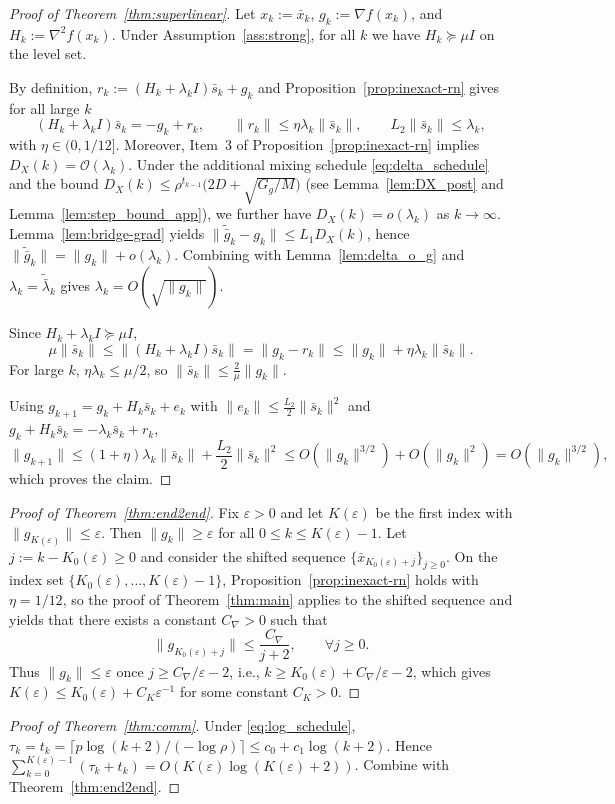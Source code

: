 \documentclass[11pt,a4paper]{article}
\def\cO{O}%
\newcommand{\cO}{\mathcal{O}}
\begin{document}
\begin{proof}[Proof of Theorem~\ref{thm:superlinear}]
Let $x_k:=\bar x_k$, $g_k:=\nabla f(x_k)$, and $H_k:=\nabla^2 f(x_k)$.
Under Assumption~\ref{ass:strong}, for all $k$ we have $H_k\succeq \mu I$ on the level set.

By definition, $r_k:=(H_k+\lambda_k I)\bar s_k+g_k$ and Proposition~\ref{prop:inexact-rn} gives for all large $k$
\[
(H_k+\lambda_k I)\bar s_k=-g_k+r_k,\qquad \|r_k\|\le \eta\lambda_k\|\bar s_k\|,\qquad L_2\|\bar s_k\|\le \lambda_k,
\]
with $\eta\in(0,1/12]$. Moreover, Item~3 of Proposition~\ref{prop:inexact-rn} implies $D_X(k)=\mathcal O(\lambda_k)$.
Under the additional mixing schedule \eqref{eq:delta_schedule} and the bound
$D_X(k)\le \rho^{t_{k-1}}\big(2D+\sqrt{G_g/M}\big)$ (see Lemma~\ref{lem:DX_post} and Lemma~\ref{lem:step_bound_app}),
we further have $D_X(k)=o(\lambda_k)$ as $k\to\infty$.
Lemma~\ref{lem:bridge-grad} yields
$\|\tilde{\bar g}_k-g_k\|\le L_1D_X(k)$, hence $\|\tilde{\bar g}_k\|=\|g_k\|+o(\lambda_k)$.
Combining with Lemma~\ref{lem:delta_o_g} and $\lambda_k=\tilde{\bar\lambda}_k$ gives $\lambda_k=\cO(\sqrt{\|g_k\|})$.

Since $H_k+\lambda_k I\succeq \mu I$,
\[
\mu\|\bar s_k\|\le \|(H_k+\lambda_k I)\bar s_k\|=\|g_k-r_k\|\le \|g_k\|+\eta\lambda_k\|\bar s_k\|.
\]
For large $k$, $\eta\lambda_k\le \mu/2$, so $\|\bar s_k\|\le \frac{2}{\mu}\|g_k\|$.

Using $g_{k+1}=g_k+H_k\bar s_k+e_k$ with $\|e_k\|\le \frac{L_2}{2}\|\bar s_k\|^2$ and $g_k+H_k\bar s_k=-\lambda_k\bar s_k+r_k$,
\[
\|g_{k+1}\|\le (1+\eta)\lambda_k\|\bar s_k\|+\frac{L_2}{2}\|\bar s_k\|^2
\le \cO(\|g_k\|^{3/2})+\cO(\|g_k\|^2)=\cO(\|g_k\|^{3/2}),
\]
which proves the claim.
\end{proof}



\begin{proof}[Proof of Theorem~\ref{thm:end2end}]
Fix $\varepsilon>0$ and let $K(\varepsilon)$ be the first index with $\|g_{K(\varepsilon)}\|\le \varepsilon$.
Then $\|g_k\|\ge \varepsilon$ for all $0\le k\le K(\varepsilon)-1$.
Let $j:=k-K_0(\varepsilon)\ge 0$ and consider the shifted sequence $\{\bar x_{K_0(\varepsilon)+j}\}_{j\ge 0}$.
On the index set $\{K_0(\varepsilon),\dots,K(\varepsilon)-1\}$, Proposition~\ref{prop:inexact-rn} holds with $\eta=1/12$,
so the proof of Theorem~\ref{thm:main} applies to the shifted sequence and yields that there exists a constant
$C_{\nabla}>0$ such that
\[
\|g_{K_0(\varepsilon)+j}\|\le \frac{C_{\nabla}}{j+2},\qquad \forall j\ge 0.
\]
Thus $\|g_k\|\le \varepsilon$ once $j\ge C_{\nabla}/\varepsilon-2$, i.e., $k\ge K_0(\varepsilon)+C_{\nabla}/\varepsilon-2$,
which gives $K(\varepsilon)\le K_0(\varepsilon)+C_K\varepsilon^{-1}$ for some constant $C_K>0$.
\end{proof}

\begin{proof}[Proof of Theorem~\ref{thm:comm}]
Under \eqref{eq:log_schedule}, $\tau_k=t_k=\lceil p\log(k+2)/(-\log\rho)\rceil\le c_0+c_1\log(k+2)$.
Hence $\sum_{k=0}^{K(\varepsilon)-1}(\tau_k+t_k)=\cO(K(\varepsilon)\log(K(\varepsilon)+2))$.
Combine with Theorem~\ref{thm:end2end}.
\end{proof}
\end{document}
